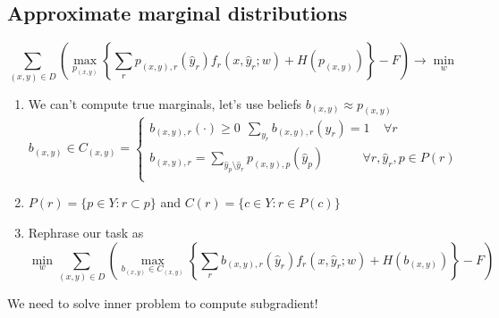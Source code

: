 \documentclass{beamer}
\begin{document}
\subsection*{Approximate marginal distributions}
 \begin{frame}
	\begin{tcolorbox}[colback=white!2, colframe=red!90]
		\vspace{-0.5cm}
		$$\sum_{(x, y) \in D} \left(\max_{p_{(x, y)}} \left\{ \sum_r p_{(x, y), r} (\hat{y}_r) f_r(x, \hat{y}_r; w) + H(p_{(x, y)})\right\}- F \right) \rightarrow \min_w$$
	\end{tcolorbox}
 		
 	\begin{enumerate}
 		\item We can't compute true marginals, let's use  beliefs $b_{(x, y)} \approx p_{(x, y)}$
	 		{\small
	 		$$b_{(x, y)} \in C_{(x, y)} = 
		 		\begin{cases} 
			 		b_{(x, y), r}(\cdot) \geq 0~~\sum_{y_r} b_{(x, y), r}(y_r) = 1 ~~~~~ \forall r\\  
				 	b_{(x, y), r}  = \sum_{\hat{y}_p \setminus \hat{y}_r} p_{(x, y), p} (\hat{y}_p) ~~~~~~~~~~~~~~ \forall r, \hat{y}_r, p \in P(r)\\  
				 \end{cases}$$} 		
		\item $P(r) = \{p \in Y: r \subset p\}$ and $C(r) = \{c \in Y: r \in P(c)\}$  
 		\item Rephrase our task as
	 		{\small
		 		$$\min_w \sum_{(x, y) \in D} \left( \max_{b_{(x, y)} \in C_{(x, y)}} \left\{ \sum_r b_{(x, y), r} (\hat{y}_r) f_r(x, \hat{y}_r; w) + H(b_{(x, y)})\right\}- F \right) $$}
 	\end{enumerate}
 	
	\begin{tcolorbox}[colback=gray!2, colframe=red!90, title=Problem]
		\centering We need to solve inner problem to compute subgradient!
	\end{tcolorbox}
 \end{frame}
 
 
\end{document}
